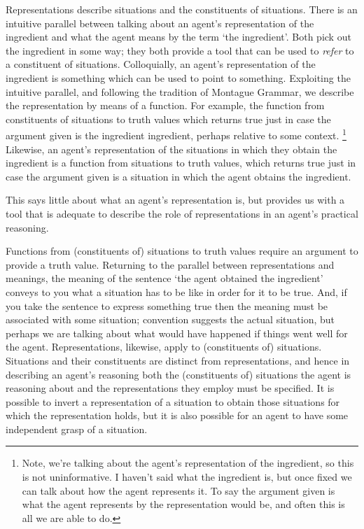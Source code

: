 \documentclass[10pt]{article}
\begin{document}
Representations describe situations and the constituents of situations.
There is an intuitive parallel between talking about an agent's representation of the ingredient and what the agent means by the term `the ingredient'.
Both pick out the ingredient in some way; they both provide a tool that can be used to \emph{refer} to a constituent of situations.
Colloquially, an agent's representation of the ingredient is something which can be used to point to something.
Exploiting the intuitive parallel, and following the tradition of Montague Grammar, we describe the representation by means of a function.
For example, the function from constituents of situations to truth values which returns true just in case the argument given is the ingredient ingredient, perhaps relative to some context.\nolinebreak
\footnote{Note, we're talking about the agent's representation of the ingredient, so this is not uninformative.
  I haven't said what the ingredient is, but once fixed we can talk about how the agent represents it.
  To say the argument given is what the agent represents by the representation would be, and often this is all we are able to do.}
Likewise, an agent's representation of the situations in which they obtain the ingredient is a function from situations to truth values, which returns true just in case the argument given is a situation in which the agent obtains the ingredient.

This says little about what an agent's representation is, but provides us with a tool that is adequate to describe the role of representations in an agent's practical reasoning.

Functions from (constituents of) situations to truth values require an argument to provide a truth value.
Returning to the parallel between representations and meanings, the meaning of the sentence `the agent obtained the ingredient' conveys to you what a situation has to be like in order for it to be true.
And, if you take the sentence to express something true then the meaning must be associated with some situation; convention suggests the actual situation, but perhaps we are talking about what would have happened if things went well for the agent.
Representations, likewise, apply to (constituents of) situations.
Situations and their constituents are distinct from representations, and hence in describing an agent's reasoning both the (constituents of) situations the agent is reasoning about and the representations they employ must be specified.
It is possible to invert a representation of a situation to obtain those situations for which the representation holds, but it is also possible for an agent to have some independent grasp of a situation.
\end{document}
